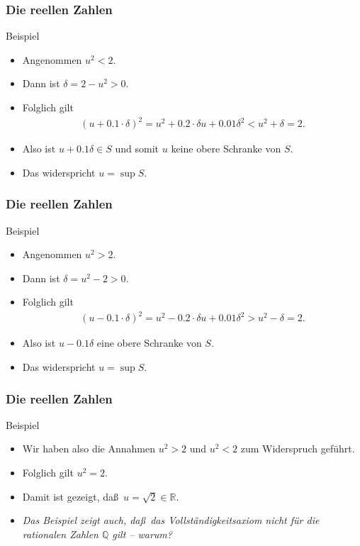 \documentclass{beamer}
\newcommand\QQ{\mathbb Q}
\newcommand\RR{\mathbb R}
\renewcommand{\ae}{\"a}
\newcommand{\ue}{\"u}
\newcommand{\mytitle}{Die reellen Zahlen}
\begin{document}
\begin{frame}\frametitle{\mytitle}
	\begin{block}{Beispiel}
	\begin{itemize}
		\item \alert{Angenommen $u^2<2$.}
		\item Dann ist $\delta=2-u^2>0$.
		\item Folglich gilt
			\begin{align*}
				(u+0.1\cdot\delta)^2=u^2+0.2\cdot\delta u+0.01\delta^2<u^2+\delta=2.
			\end{align*}
		\item Also ist $u+0.1\delta\in S$ und somit $u$ keine obere Schranke von $S$.
		\item Das widerspricht $u=\sup S$.
	\end{itemize}
	\end{block}
\end{frame}

\begin{frame}\frametitle{\mytitle}
	\begin{block}{Beispiel}
	\begin{itemize}
		\item \alert{Angenommen $u^2>2$.}
		\item Dann ist $\delta=u^2-2>0$.
		\item Folglich gilt
			\begin{align*}
				(u-0.1\cdot\delta)^2=u^2-0.2\cdot\delta u+0.01\delta^2>u^2-\delta=2.
			\end{align*}
		\item Also ist $u-0.1\delta$ eine obere Schranke von $S$.
		\item Das widerspricht $u=\sup S$.
	\end{itemize}
	\end{block}
\end{frame}

\begin{frame}\frametitle{\mytitle}
	\begin{block}{Beispiel}
	\begin{itemize}
		\item Wir haben also die Annahmen $u^2>2$ und $u^2<2$ zum Widerspruch gef\ue hrt.
		\item Folglich gilt $u^2=2$.
		\item Damit ist gezeigt, da\ss\ $u=\sqrt 2\in\RR$.
		\item {\itshape Das Beispiel zeigt auch, da\ss\ das Vollst\ae ndigkeitsaxiom nicht f\ue r die rationalen Zahlen $\QQ$ gilt -- warum?}
	\end{itemize}
	\end{block}
\end{frame}
\end{document}
